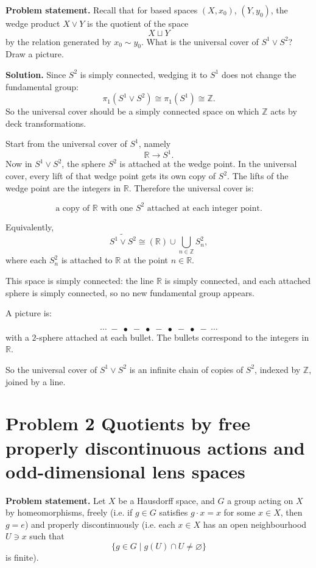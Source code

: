 \documentclass[12pt,a4paper]{article}
\theoremstyle{notespace}
\begin{document}
\textbf{Problem statement.}
Recall that for based spaces \((X,x_0)\), \((Y,y_0)\), the wedge product \(X \vee Y\) is the quotient of the space
\[
X \sqcup Y
\]
by the relation generated by \(x_0 \sim y_0\).
What is the universal cover of \(S^1 \vee S^2\)? Draw a picture.

\textbf{Solution.}
Since \(S^2\) is simply connected, wedging it to \(S^1\) does not change the fundamental group:
\[
\pi_1(S^1 \vee S^2)\cong \pi_1(S^1)\cong \mathbb{Z}.
\]
So the universal cover should be a simply connected space on which \(\mathbb{Z}\) acts by deck transformations.

Start from the universal cover of \(S^1\), namely
\[
\mathbb{R}\to S^1.
\]
Now in \(S^1\vee S^2\), the sphere \(S^2\) is attached at the wedge point. In the universal cover, every lift of that wedge point gets its own copy of \(S^2\). The lifts of the wedge point are the integers in \(\mathbb{R}\). Therefore the universal cover is:

\[
\text{a copy of }\mathbb{R}\text{ with one }S^2\text{ attached at each integer point.}
\]

Equivalently,
\[
\widetilde{S^1\vee S^2}
\cong
\left(\mathbb{R}\right)\cup \bigcup_{n\in\mathbb{Z}} S^2_n,
\]
where each \(S^2_n\) is attached to \(\mathbb{R}\) at the point \(n\in\mathbb{R}\).

This space is simply connected: the line \(\mathbb{R}\) is simply connected, and each attached sphere is simply connected, so no new fundamental group appears.

A picture is:

\[
\cdots \;-\; \bullet \;-\; \bullet \;-\; \bullet \;-\; \bullet \;-\; \cdots
\]
with a \(2\)-sphere attached at each bullet. The bullets correspond to the integers in \(\mathbb{R}\).

So the universal cover of \(S^1\vee S^2\) is an infinite chain of copies of \(S^2\), indexed by \(\mathbb{Z}\), joined by a line.


\section{Problem 2 Quotients by free properly discontinuous actions and odd-dimensional lens spaces}

\textbf{Problem statement.}
Let \(X\) be a Hausdorff space, and \(G\) a group acting on \(X\) by homeomorphisms, freely (i.e. if \(g\in G\) satisfies \(g\cdot x=x\) for some \(x\in X\), then \(g=e\)) and properly discontinuously (i.e. each \(x\in X\) has an open neighbourhood \(U\ni x\) such that
\[
\{g\in G\mid g(U)\cap U\neq \varnothing\}
\]
is finite).
\end{document}
